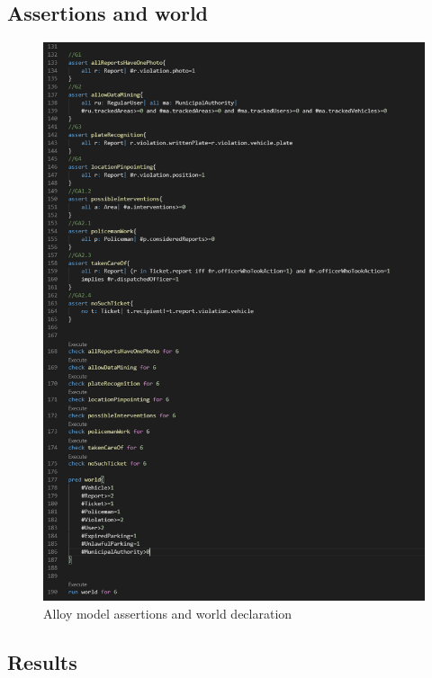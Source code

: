 \subsection{Assertions and world}
\begin{figure}[h!]
	\includegraphics[scale=0.60]{Images/Assertions_and_world_1-1}
	\caption{Alloy model assertions and world declaration}
\end{figure}
\newpage
\subsection{Results}
